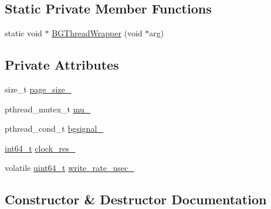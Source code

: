 \subsection*{Static Private Member Functions}
\begin{DoxyCompactItemize}
\item 
static void $\ast$ \hyperlink{classleveldb_1_1anonymous__namespace_02env__posix_8cc_03_1_1_posix_env_ae9c890a52f8cb2eccd19d63fc5626f59}{B\+G\+Thread\+Wrapper} (void $\ast$arg)
\end{DoxyCompactItemize}
\subsection*{Private Attributes}
\begin{DoxyCompactItemize}
\item 
size\+\_\+t \hyperlink{classleveldb_1_1anonymous__namespace_02env__posix_8cc_03_1_1_posix_env_ad535da9e32d50abc5290e5fd13c0127c}{page\+\_\+size\+\_\+}
\item 
pthread\+\_\+mutex\+\_\+t \hyperlink{classleveldb_1_1anonymous__namespace_02env__posix_8cc_03_1_1_posix_env_a5503136da6796202cc393fd419e84847}{mu\+\_\+}
\item 
pthread\+\_\+cond\+\_\+t \hyperlink{classleveldb_1_1anonymous__namespace_02env__posix_8cc_03_1_1_posix_env_a932e2e041dabdf6bfea2140facf9aa85}{bgsignal\+\_\+}
\item 
\hyperlink{stdint_8h_adec1df1b8b51cb32b77e5b86fff46471}{int64\+\_\+t} \hyperlink{classleveldb_1_1anonymous__namespace_02env__posix_8cc_03_1_1_posix_env_aafd43c190f3d72ce9a954294eb2332b8}{clock\+\_\+res\+\_\+}
\item 
volatile \hyperlink{stdint_8h_aaa5d1cd013383c889537491c3cfd9aad}{uint64\+\_\+t} \hyperlink{classleveldb_1_1anonymous__namespace_02env__posix_8cc_03_1_1_posix_env_aaffb7d0312562394436495a29790bfcb}{write\+\_\+rate\+\_\+usec\+\_\+}
\end{DoxyCompactItemize}


\subsection{Constructor \& Destructor Documentation}
\hypertarget{classleveldb_1_1anonymous__namespace_02env__posix_8cc_03_1_1_posix_env_a2f71090e958f1cdc54f0ce77e05326c0}{}
